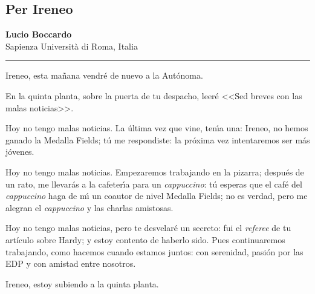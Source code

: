%
%
%
%

\subsection{\guillemotleft Per Ireneo\guillemotright }


\begin{center}\large
\textbf{Lucio Boccardo}\\[1em] 
Sapienza Universit\`a di Roma, Italia\\
{\color{azulsema}\rule{.5\linewidth}{1pt}}
\end{center}

\vskip 5mm


Ireneo, esta ma\~nana vendr\'e  de nuevo a la  Aut\'onoma.   

En la quinta planta, sobre la puerta de tu despacho, leer\'e <<Sed breves con las malas noticias>>.

Hoy no tengo malas noticias. La \'ultima vez que vine, ten\'{\i}a una:
Ireneo, no hemos ganado la Medalla Fields; t\'u me respondiste:
la pr\'oxima vez intentaremos ser m\'as j\'ovenes.

Hoy no tengo malas noticias. Empezaremos trabajando en la pizarra; despu\'es de un rato, me llevar\'as a la cafeter\'{\i}a para un \textit{cappuccino}: t\'u esperas que el caf\'e del \textit{cappuccino} haga de m\'{\i} un coautor de nivel Medalla Fields; no es verdad, pero me alegran el \textit{cappuccino} y las charlas amistosas.
 
Hoy no tengo malas noticias, pero te desvelar\'e un secreto: fui el \textit{referee} de tu art\'iculo sobre Hardy; y estoy contento de haberlo sido. Pues continuaremos trabajando, como hacemos cuando estamos juntos: con serenidad, pasi\'on por las EDP   y  con amistad entre nosotros.

Ireneo, estoy subiendo a la quinta planta.

%
%

\begin{center}
\mbox{}\\[.1ex]
\resizebox{.5\linewidth}{!}{\color{azulsema}\rule{.5\linewidth}{1pt}
{\large $\diamond$} {\huge $\diamond$} {\large $\diamond$} \rule{.5\linewidth}{1pt}}
\end{center}
